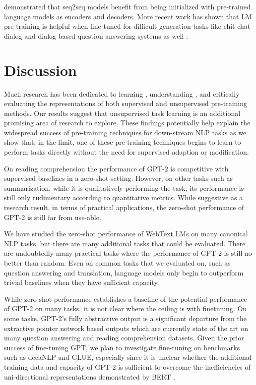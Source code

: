 \documentclass{article}
\begin{document}
\cite{ramachandran2016unsupervised} demonstrated that seq2seq models benefit from being initialized with pre-trained language models as encoders and decoders. More recent work has shown that LM pre-training is helpful when fine-tuned for difficult generation tasks like chit-chat dialog and dialog based question answering systems as well \cite{wolf2019transfertransfo} \cite{dinan2018wizard}.


\section{Discussion}

Much research has been dedicated to learning \cite{hill2016learning}, understanding \cite{levy2014neural}, and critically evaluating \cite{wieting2019no} the representations of both supervised and unsupervised pre-training methods. Our results suggest that unsupervised task learning is an additional promising area of research to explore. These findings potentially help explain the widespread success of pre-training techniques for down-stream NLP tasks as we show that, in the limit, one of these pre-training techniques begins to learn to perform tasks directly without the need for supervised adaption or modification.

On reading comprehension the performance of GPT-2 is competitive with supervised baselines in a zero-shot setting. However, on other tasks such as summarization, while it is qualitatively performing the task, its performance is still only rudimentary according to quantitative metrics. While suggestive as a research result, in terms of practical applications, the zero-shot performance of GPT-2 is still far from use-able.

We have studied the zero-shot performance of WebText LMs on many canonical NLP tasks, but there are many additional tasks that could be evaluated. There are undoubtedly many practical tasks where the performance of GPT-2 is still no better than random. Even on common tasks that we evaluated on, such as question answering and translation, language models only begin to outperform trivial baselines when they have sufficient capacity.

While zero-shot performance establishes a baseline of the potential performance of GPT-2 on many tasks, it is not clear where the ceiling is with finetuning. On some tasks, GPT-2's fully abstractive output is a significant departure from the extractive pointer network \cite{vinyals2015pointer} based outputs which are currently state of the art on many question answering and reading comprehension datasets. Given the prior success of fine-tuning GPT, we plan to investigate fine-tuning on benchmarks such as decaNLP and GLUE, especially since it is unclear whether the additional training data and capacity of GPT-2 is sufficient to overcome the inefficiencies of uni-directional representations demonstrated by BERT \cite{devlin2018bert}.
\end{document}
